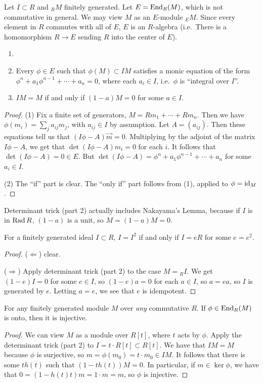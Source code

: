  Let $I\subset R$ and ${}_R M$ finitely generated. Let
 $E=\operatorname{End}_R (M)$, which is not commutative in general. We may view $M$ as an $E$-module
 ${}_E M$. Since every element in $R$ commutes with all of $E$, $E$ is an $R$-algebra (i.e.\
 There is a homomorphism $R\to E$ sending $R$ into the center of $E$).
 \begin{lemma}
  \begin{enumerate}\item[]
    \item Every $\phi\in E$ such that $\phi(M)\subset IM$ satisfies a monic equation
    of the form $\phi^n+a_1\phi^{n-1} +\cdots + a_n=0$, where each $a_i\in I$, i.e.\
    $\phi$ is ``integral over $I$''.

    \item $IM=M$ if and only if $(1-a)M=0$ for some $a\in I$.
  \end{enumerate}
 \end{lemma}
 \begin{proof}
   (1) Fix a finite set of generators, $M=Rm_1+\cdots + Rm_n$. Then we have
   $\phi(m_i)=\sum_j a_{ij} m_j$, with $a_{ij}\in I$ by assumption. Let $A=(a_{ij})$.
   Then these equations tell us that $(I\phi-A)\vec{m}=0$. Multiplying by the adjoint of
   the matrix $I\phi-A$, we get that $\det(I\phi-A)m_i=0$ for each $i$. It follows that
   $\det(I\phi-A)=0\in E$. But $\det(I\phi-A)=\phi^n+a_1\phi^{n-1}+\cdots +a_n$ for some
   $a_i\in I$.

   (2) The ``if'' part is clear. The ``only if'' part follows from (1), applied to
   $\phi=\operatorname{id}_M$.
 \end{proof}
 \begin{remark}
   Determinant trick (part 2) actually includes Nakayama's Lemma, because if $I$ is in
   $\operatorname{Rad} R$, $(1-a)$ is a unit, so $M=(1-a)M=0$.
 \end{remark}
 \begin{corollary}
   For a finitely generated ideal $I\subset R$, $I=I^2$ if and only if $I=eR$ for some
   $e=e^2$.
 \end{corollary}
 \begin{proof}
   ($\Leftarrow$) clear.

   ($\Rightarrow$) Apply determinant trick (part 2) to the case $M={}_R I$. We get
   $(1-e)I=0$ for some $e\in I$, so $(1-e)a=0$ for each $a\in I$, so $a=ea$, so $I$ is
   generated by $e$. Letting $a=e$, we see that $e$ is idempotent.
 \end{proof}
 \begin{corollary}
   For any finitely generated module $M$ over \emph{any} commutative $R$. If $\phi\in
   \operatorname{End}_R(M)$ is onto, then it is injective.
 \end{corollary}
 \begin{proof}
   We can view $M$ as a module over $R[t]$, where $t$ acts by $\phi$. Apply the
   determinant trick (part 2) to $I=t\cdot R[t]\subset R[t]$. We have that $IM=M$
   because $\phi$ is surjective, so $m =\phi(m_0)=t\cdot m_0\in IM$. It follows that
   there is some $th(t)$ such that $(1-th(t))M=0$. In particular, if $m\in  \ker \phi$,
   we have that $0=(1-h(t)t)m=1\cdot m=m$, so $\phi$ is injective.
 \end{proof}

